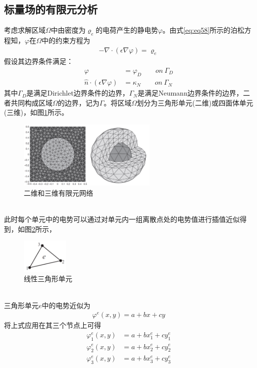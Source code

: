 \documentclass{article}
\numberwithin{equation}{section}
\begin{document}
\subsection{标量场的有限元分析}
考虑求解区域$\Omega$中由密度为$\varrho_e$的电荷产生的静电势$\varphi$。由式\ref{eq:eq58}所示的泊松方程知，$\varphi$在$\Omega$中的约束方程为
\begin{align}
    \label{eq:eq723}
    -\nabla\cdot(\epsilon\nabla\varphi)=\varrho_e
\end{align}
假设其边界条件满足：
\begin{align}
    \label{eq:eq724}
    \varphi&=\varphi_D \qquad on~\Gamma_D \\
    \label{eq:eq725}
    \hat{n}\cdot(\epsilon\nabla\varphi)&=\kappa_N \qquad on~\Gamma_N
\end{align}
其中$\Gamma_D$是满足Dirichlet边界条件的边界，$\Gamma_N$是满足Neumann边界条件的边界，二者共同构成区域$\Omega$的边界，记为$\Gamma$。将区域$\Omega$划分为三角形单元(二维)或四面体单元(三维)，如图\ref{fig:fig57}所示。
\begin{figure}[ht]
    \centering
    \includegraphics[width=0.6\textwidth]{二维和三维有限元网络.PNG}
    \caption{二维和三维有限元网络}
    \label{fig:fig57}
\end{figure}
\\
此时每个单元中的电势可以通过对单元内一组离散点处的电势值进行插值近似得到，如图\ref{fig:fig58}所示，
\begin{figure}[ht]
    \centering
    \includegraphics[width=0.2\textwidth]{线性三角形单元.PNG}
    \caption{线性三角形单元}
    \label{fig:fig58}
\end{figure}
\\
三角形单元$e$中的电势近似为
\begin{align}
    \label{eq:eq726}
    \varphi^e(x,y)=a+bx+cy
\end{align}
将上式应用在其三个节点上可得
\begin{align}
    \label{eq:eq727}
    \varphi_1^e(x,y)&=a+bx_1^e+cy_1^e \\
    \label{eq:eq728}
    \varphi_2^e(x,y)&=a+bx_2^e+cy_2^e \\
    \label{eq:eq729}
    \varphi_3^e(x,y)&=a+bx_3^e+cy_3^e
\end{align}
\end{document}
